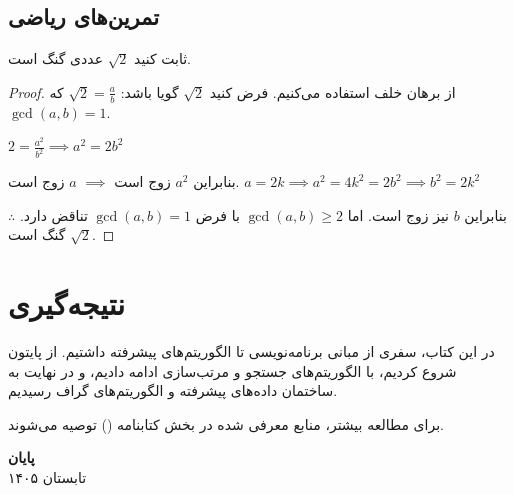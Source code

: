 \documentclass{matinbook}
\begin{document}
\section{تمرین‌های ریاضی}

\begin{exercise}
    ثابت کنید $\sqrt{2}$ عددی گنگ است.
    \label{exc:sqrt2}
\end{exercise}

\begin{proof}
    از برهان خلف استفاده می‌کنیم.
    فرض کنید $\sqrt{2}$ گویا باشد:
    $\sqrt{2} = \frac{a}{b}$ که $\gcd(a,b) = 1$.

    $2 = \frac{a^{2}}{b^{2}} \implies a^{2} = 2b^{2}$

    بنابراین $a^{2}$ زوج است $\implies$ $a$ زوج است.
    $a = 2k \implies a^{2} = 4k^{2} = 2b^{2}
    \implies b^{2} = 2k^{2}$

    بنابراین $b$ نیز زوج است.
    اما $\gcd(a,b) \geq 2$ با فرض $\gcd(a,b) = 1$
    تناقض دارد. $\therefore$ $\sqrt{2}$ گنگ است.
\end{proof}

\chapter{نتیجه‌گیری}
\label{chap:conclusion}

در این کتاب، سفری از مبانی برنامه‌نویسی
تا الگوریتم‌های پیشرفته داشتیم.
از پایتون شروع کردیم،
با الگوریتم‌های جستجو
و مرتب‌سازی ادامه دادیم،
و در نهایت به ساختمان داده‌های پیشرفته
و الگوریتم‌های گراف رسیدیم.

برای مطالعه بیشتر، منابع معرفی شده
در بخش کتابنامه (\cite{knuth1984,cormen2009})
توصیه می‌شوند.

\begin{flushleft}
    \textbf{پایان}\\
    تابستان ۱۴۰۵
\end{flushleft}

\begin{latin}
\printbibliography[title={منابع و مراجع}]
\end{latin}

\printindex
\end{document}
